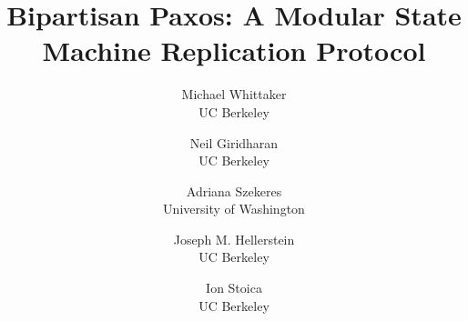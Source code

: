 \documentclass[letterpaper,twocolumn,10pt]{article}
\begin{document}
\date{}

\title{Bipartisan Paxos: A Modular State Machine Replication Protocol}

\author{%
{\rm Michael Whittaker}\\
UC Berkeley
\and
{\rm Neil Giridharan}\\
UC Berkeley
\and
{\rm Adriana Szekeres}\\
University of Washington
\and
{\rm Joseph M. Hellerstein}\\
UC Berkeley
\and
{\rm Ion Stoica}\\
UC Berkeley
}

\maketitle

{}
{}
{}
{}
{}
{}
{}
{}
{}




\appendix
{}
\end{document}
